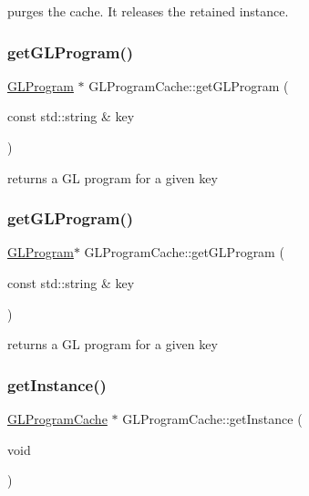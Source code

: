 purges the cache. It releases the retained instance. \mbox{\label{classGLProgramCache_ac2eed97e0ec0fffc8583505772cf9f82}} 
\subsubsection{\texorpdfstring{get\+G\+L\+Program()}{getGLProgram()}\hspace{0.1cm}{\footnotesize\ttfamily [1/2]}}
{\footnotesize\ttfamily \hyperlink{classGLProgram}{G\+L\+Program} $\ast$ G\+L\+Program\+Cache\+::get\+G\+L\+Program (\begin{DoxyParamCaption}\item[{const std\+::string \&}]{key }\end{DoxyParamCaption})}

returns a GL program for a given key \mbox{\label{classGLProgramCache_a0a245892227ed273bba1b3db68e18f66}} 
\subsubsection{\texorpdfstring{get\+G\+L\+Program()}{getGLProgram()}\hspace{0.1cm}{\footnotesize\ttfamily [2/2]}}
{\footnotesize\ttfamily \hyperlink{classGLProgram}{G\+L\+Program}$\ast$ G\+L\+Program\+Cache\+::get\+G\+L\+Program (\begin{DoxyParamCaption}\item[{const std\+::string \&}]{key }\end{DoxyParamCaption})}

returns a GL program for a given key \mbox{\label{classGLProgramCache_a084359da301355ed6c32b12689669d37}} 
\subsubsection{\texorpdfstring{get\+Instance()}{getInstance()}\hspace{0.1cm}{\footnotesize\ttfamily [1/2]}}
{\footnotesize\ttfamily \hyperlink{classGLProgramCache}{G\+L\+Program\+Cache} $\ast$ G\+L\+Program\+Cache\+::get\+Instance (\begin{DoxyParamCaption}\item[{void}]{ }\end{DoxyParamCaption})\hspace{0.3cm}{\ttfamily [static]}}


